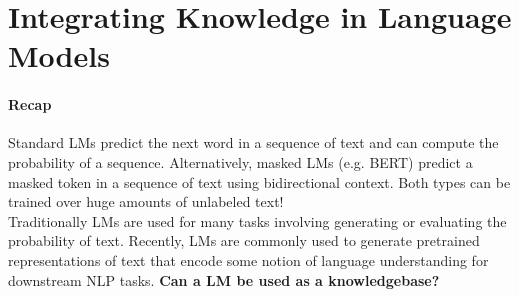 \documentclass[10pt]{report}
\begin{document}
\section{Integrating Knowledge in Language Models}
\paragraph{Recap} Standard LMs predict the next word in a sequence of text and can compute the probability of a sequence. Alternatively, masked LMs (e.g. BERT) predict a masked token in a sequence of text using bidirectional context. Both types can be trained over huge amounts of unlabeled text!\\
Traditionally LMs are used for many tasks involving generating or evaluating the probability of text. Recently, LMs are commonly used to generate pretrained representations of text that encode some notion of language understanding for downstream NLP tasks. \textbf{Can a LM be used as a knowledgebase?}
\end{document}
